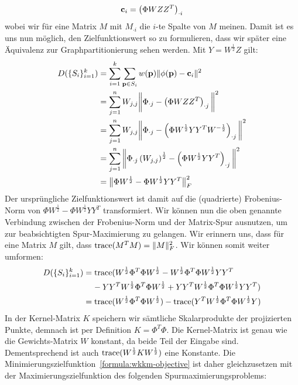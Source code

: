 \[ \mathbf{c}_i = \left(\Phi W Z Z^T\right)_{\cdot i} \]
wobei wir für eine Matrix $M$ mit $M_{\cdot i}$ die $i$-te Spalte von $M$ meinen. Damit ist es uns nun möglich, den
Zielfunktionswert so zu formulieren, dass wir später eine Äquivalenz zur Graphpartitionierung sehen werden. Mit
$Y = W^{\frac{1}{2}} Z$ gilt:
\begin{align*}
	D(\{S_i\}_{i=1}^{k}) &= \sum_{i=1}^{k} \sum_{\mathbf{p} \in S_i} w(\mathbf{p}) \lVert {\phi(\ensuremath{\mathbf{p}})} - {\mathbf{c}_i} \rVert^2 \\
		&= \sum_{j=1}^{n} W_{j,j} \bigg\lVert \Phi_{\cdot j} - \left( \Phi W Z Z^T \right)_{\cdot j} \bigg\rVert^2 \\
		&= \sum_{j=1}^{n} W_{j,j} \bigg\lVert \Phi_{\cdot j} - \left( \Phi W^{\frac{1}{2}} Y Y^T W^{-\frac{1}{2}} \right)_{\cdot j} \bigg\rVert^2 \\
		&= \sum_{j=1}^{n} \bigg\lVert \Phi_{\cdot j} \left(W_{j,j}\right)^{\frac{1}{2}} - \left( \Phi W^{\frac{1}{2}} Y Y^T \right)_{\cdot j} \bigg\rVert^2 \\
		&= \big\lVert \Phi W^{\frac{1}{2}} - \Phi W^{\frac{1}{2}} Y Y^T \big\rVert_F^2
\end{align*}
Der ursprüngliche Zielfunktionswert ist damit auf die (quadrierte) Frobenius-Norm von
$\Phi W^{\frac{1}{2}} - \Phi W^{\frac{1}{2}} Y Y^T$ transformiert.
Wir können nun die oben genannte Verbindung zwischen der Frobenius-Norm und der Matrix-Spur ausnutzen, um zur beabsichtigten
Spur-Maximierung zu gelangen. Wir erinnern uns, dass für eine Matrix $M$ gilt, dass $\operatorname*{trace}(M^TM) = \lVert{M}\rVert_F^2$. Wir können
somit weiter umformen:
\begin{align*}
	D(\{S_i\}_{i=1}^{k}) &= \operatorname*{trace}( W^{\frac{1}{2}} \Phi^T \Phi W^{\frac{1}{2}} - W^{\frac{1}{2}} \Phi^T \Phi W^{\frac{1}{2}} Y Y^T \\
		& \; \; \; \; - Y Y^T W^{\frac{1}{2}} \Phi^T \Phi W^{\frac{1}{2}} + Y Y^T W^{\frac{1}{2}} \Phi^T \Phi W^{\frac{1}{2}} Y Y^T ) \\
		&= \operatorname*{trace}( W^{\frac{1}{2}} \Phi^T \Phi W^{\frac{1}{2}} ) - \operatorname*{trace}( Y^T W^{\frac{1}{2}} \Phi^T \Phi W^{\frac{1}{2}} Y )
\end{align*}
In der Kernel-Matrix $K$ speichern wir sämtliche Skalarprodukte der projizierten Punkte, demnach ist per Definition
$K = \Phi^T \Phi$.
Die Kernel-Matrix ist genau wie die Gewichts-Matrix $W$ konstant, da beide Teil der Eingabe sind. Dementsprechend ist auch
$\operatorname*{trace}( W^{\frac{1}{2}} K W^{\frac{1}{2}} )$ eine Konstante. Die Minimierungszielfunktion~\ref{formula:wkkm-objective} ist
daher gleichzusetzen mit der Maximierungszielfunktion des folgenden Spurmaximierungsproblems:
